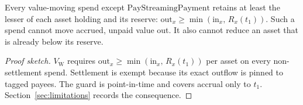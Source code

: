 \documentclass[11pt,DIV=11,parskip=half-]{scrartcl}
\begin{document}
\begin{theorem}
Every value-moving spend except $\mathrm{PayStreamingPayment}$ retains at least the lesser of each asset holding and its reserve: $\mathrm{out}_x \ge \min(\mathrm{in}_x,\, R_x(t_1))$. Such a spend cannot move accrued, unpaid value out. It also cannot reduce an asset that is already below its reserve.
\end{theorem}
\begin{proof}[Proof sketch]
$V_{\mathrm{W}}$ requires $\mathrm{out}_x \ge \min(\mathrm{in}_x,\, R_x(t_1))$ per asset on every non-settlement spend. Settlement is exempt because its exact outflow is pinned to tagged payees. The guard is point-in-time and covers accrual only to $t_1$. Section~\ref{sec:limitations} records the consequence.
\end{proof}
\end{document}
